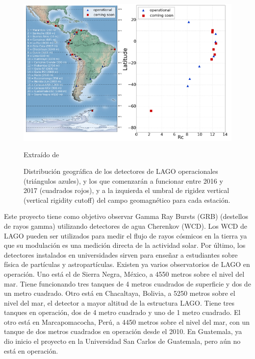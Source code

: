 \documentclass{book}
\begin{document}
\begin{figure}[ht] %
\begin{center}
 \includegraphics[width = 0.8\linewidth]{ASOREY2015.png}
 
 Extra\'ido de \citep{ASOREY2015}
\caption{Distribuci\'on geogr\'afica de los detectores de LAGO operacionales (tri\'angulos azules), y los que comenzar\'an a funcionar entre 2016 y 2017 (cuadrados rojos), y a la izquierda el umbral de rigidez vertical (vertical rigidity cutoff) del campo geomagn\'etico para cada estaci\'on.}
\end{center}
\end{figure}

Este proyecto tiene como objetivo observar Gamma Ray Bursts (GRB) (destellos de rayos gamma) utilizando detectores de agua Cherenkov (WCD). Los WCD de LAGO pueden ser utilizados para medir el flujo de rayos c\'osmicos en la tierra ya que su modulaci\'on es una medici\'on directa de la actividad solar. Por \'ultimo, los detectores instalados en universidades sirven para ense\~nar a estudiantes sobre f\'isica de part\'iculas y astropart\'iculas. Existen ya varios observatorios de LAGO en operaci\'on. Uno est\'a el de Sierra Negra, M\'exico, a 4550 metros sobre el nivel del mar. Tiene funcionando tres tanques de 4 metros cuadrados de superficie y dos de un metro cuadrado. Otro est\'a en Chacaltaya, Bolivia, a 5250 metros sobre el nivel del mar, el detector a mayor altitud de la estructura LAGO. Tiene tres tanques en operaci\'on, dos de 4 metro cuadrado y uno de 1 metro cuadrado. El otro est\'a en Marcapomacocha, Per\'u, a 4450 metros sobre el nivel del mar, con un tanque de dos metros cuadrados en operaci\'on desde el 2010. En Guatemala, ya dio inicio el proyecto en la Universidad San Carlos de Guatemala, pero a\'un no est\'a en operaci\'on. \citep{VILLASENOR}
\end{document}
